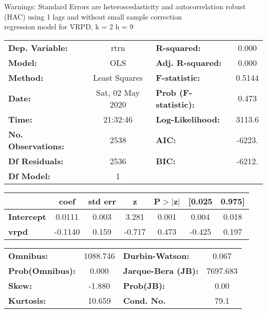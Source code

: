 Warnings: \newline
 [1] Standard Errors are heteroscedasticity and autocorrelation robust (HAC) using 1 lags and without small sample correction\\ 

regression model for VRPD, k = 2 h = 9\begin{center}
\begin{tabular}{lclc}
\toprule
\textbf{Dep. Variable:}    &       rtrn       & \textbf{  R-squared:         } &     0.000   \\
\textbf{Model:}            &       OLS        & \textbf{  Adj. R-squared:    } &     0.000   \\
\textbf{Method:}           &  Least Squares   & \textbf{  F-statistic:       } &    0.5144   \\
\textbf{Date:}             & Sat, 02 May 2020 & \textbf{  Prob (F-statistic):} &    0.473    \\
\textbf{Time:}             &     21:32:46     & \textbf{  Log-Likelihood:    } &    3113.6   \\
\textbf{No. Observations:} &        2538      & \textbf{  AIC:               } &    -6223.   \\
\textbf{Df Residuals:}     &        2536      & \textbf{  BIC:               } &    -6212.   \\
\textbf{Df Model:}         &           1      & \textbf{                     } &             \\
\bottomrule
\end{tabular}
\begin{tabular}{lcccccc}
                   & \textbf{coef} & \textbf{std err} & \textbf{z} & \textbf{P$> |$z$|$} & \textbf{[0.025} & \textbf{0.975]}  \\
\midrule
\textbf{Intercept} &       0.0111  &        0.003     &     3.281  &         0.001        &        0.004    &        0.018     \\
\textbf{vrpd}      &      -0.1140  &        0.159     &    -0.717  &         0.473        &       -0.425    &        0.197     \\
\bottomrule
\end{tabular}
\begin{tabular}{lclc}
\textbf{Omnibus:}       & 1088.746 & \textbf{  Durbin-Watson:     } &    0.067  \\
\textbf{Prob(Omnibus):} &   0.000  & \textbf{  Jarque-Bera (JB):  } & 7697.683  \\
\textbf{Skew:}          &  -1.880  & \textbf{  Prob(JB):          } &     0.00  \\
\textbf{Kurtosis:}      &  10.659  & \textbf{  Cond. No.          } &     79.1  \\
\bottomrule
\end{tabular}
\end{center}

